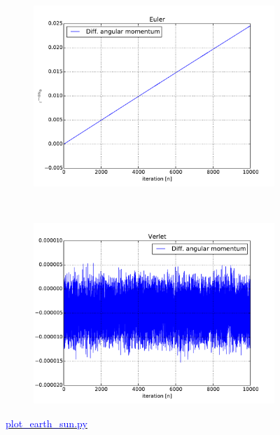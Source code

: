 \begin{figure}[H]
    \centering
    \begin{subfigure}{0.5\textwidth}
        \centering
        \includegraphics[width=\linewidth]{result/bilder/ang-momentum-euler.pdf}
    	\caption{}
    \end{subfigure}%
    ~ 
    \begin{subfigure}{0.5\textwidth}
        \centering
        \includegraphics[width=\linewidth]{result/bilder/ang-momentum-verlet.pdf}
        \caption{}
    \end{subfigure}
    \caption{\href{https://github.com/erikfsk/Project-3/blob/master/Project3/3a/plot_earth_sun.py}{\textcolor{blue}{plot\_earth\_sun.py}}}
    \label{fig:conserved-ang}
\end{figure}




